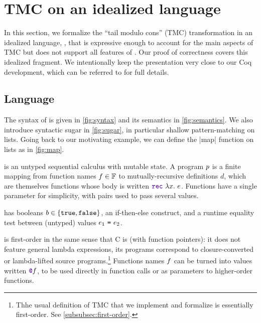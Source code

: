 \section{TMC on an idealized language}
\label{sec:formalization}

In this section, we formalize the ``tail modulo cons'' (TMC) transformation in an idealized language, \DataLang, that is expressive enough to account for the main aspects of TMC but does not support all features of \OCaml.
Our proof of correctness covers this idealized fragment.
We intentionally keep the presentation very close to our Coq development, which can be referred to for full details.






\subsection{Language}

The syntax of \DataLang is given in \cref{fig:syntax} and its semantics in \cref{fig:semantics}.
We also introduce syntactic sugar in \cref{fig:sugar}, in particular shallow pattern-matching on lists.
Going back to our motivating example, we can define the \datalang|map| function on lists as in \cref{fig:map}.

\DataLang is an untyped sequential calculus with mutable state. A \DataLang program $\datalangProg$ is a finite mapping from function names $\datalangFn \in \datalangFn[]$ to mutually-recursive definitions $d$, which are themselves functions whose body is written $\datalangRec \datalangVar \datalangExpr$. Functions have a single parameter for simplicity, with pairs used to pass several values.

\DataLang has booleans $b \in \{\texttt{true}, \texttt{false}\}$, an if-then-else construct, and a runtime equality test between (untyped) values $\datalangEq{\datalangExpr_1}{\datalangExpr_2}$.

\DataLang is first-order in the same sense that C is (with function pointers): it does not feature general lambda expressions, its programs correspond to closure-converted or lambda-lifted source programs.\footnote{
Thhe usual definition of TMC that we implement and formalize is essentially first-order. See \cref{subsubsec:first-order}.}
Functions names $\datalangFn$ can be turned into values written $\datalangFnptr{\datalangFn}$, to be used directly in function calls or as parameters to higher-order functions.

